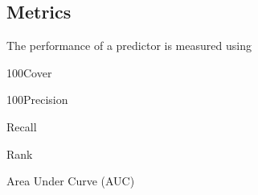 \subsection{Metrics}
The performance of a predictor is measured using 

\begin{definition}{100Cover}
\end{definition}

\begin{definition}{100Precision}
\end{definition}

\begin{definition}{Recall}
\end{definition}

\begin{definition}{Rank}
\end{definition}

\begin{definition}{Area Under Curve (AUC)}
\end{definition}

